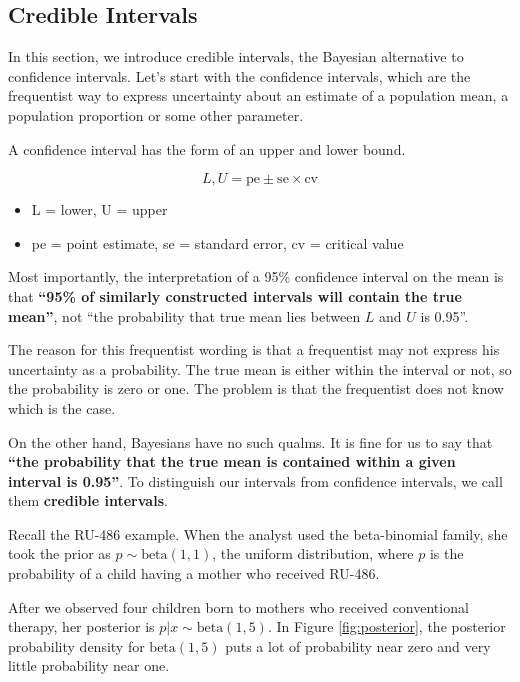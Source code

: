 \documentclass[]{book}
\providecommand{\tightlist}{%
  \setlength{\itemsep}{0pt}\setlength{\parskip}{0pt}}
\theoremstyle{definition}
\theoremstyle{definition}
\theoremstyle{remark}
\begin{document}
\subsection{Credible Intervals}\label{credible-intervals}

In this section, we introduce credible intervals, the Bayesian
alternative to confidence intervals. Let's start with the confidence
intervals, which are the frequentist way to express uncertainty about an
estimate of a population mean, a population proportion or some other
parameter.

A confidence interval has the form of an upper and lower bound.

\[L, U = \text{pe} \pm \text{se} \times \text{cv}\]

\begin{itemize}
\tightlist
\item
  L = lower, U = upper
\item
  pe = point estimate, se = standard error, cv = critical value
\end{itemize}

Most importantly, the interpretation of a 95\% confidence interval on
the mean is that \textbf{``95\% of similarly constructed intervals will
contain the true mean''}, not ``the probability that true mean lies
between \(L\) and \(U\) is 0.95''.

The reason for this frequentist wording is that a frequentist may not
express his uncertainty as a probability. The true mean is either within
the interval or not, so the probability is zero or one. The problem is
that the frequentist does not know which is the case.

On the other hand, Bayesians have no such qualms. It is fine for us to
say that \textbf{``the probability that the true mean is contained
within a given interval is 0.95''}. To distinguish our intervals from
confidence intervals, we call them \textbf{credible intervals}.

Recall the RU-486 example. When the analyst used the beta-binomial
family, she took the prior as \(p \sim \text{beta}(1,1)\), the uniform
distribution, where \(p\) is the probability of a child having a mother
who received RU-486.

After we observed four children born to mothers who received
conventional therapy, her posterior is \(p|x \sim \text{beta}(1,5)\). In
Figure \ref{fig:posterior}, the posterior probability density for
\(\text{beta}(1,5)\) puts a lot of probability near zero and very little
probability near one.
\end{document}
